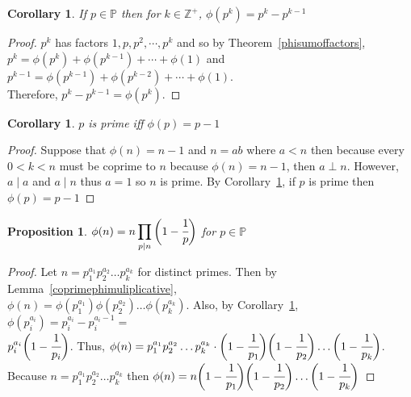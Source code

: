 \documentclass[12pt]{extarticle}
\renewcommand\qedsymbol{$\square$}
\newcommand{\divides}{\mid}
\newcommand{\Zplus}{\mathbb{Z}^{+}}
\newcommand{\Primes}{\mathbb{P}}
\newtheorem{proposition}[theorem]{Proposition}
\newtheorem{corollary}[theorem]{Corollary}
\newenvironment{lproof}{\begin{proof} \renewcommand{\qedsymbol}{}}{\end{proof}}
\begin{document}
\begin{corollary}
\label{phiofprime}
If $p \in \Primes$ then for $k \in \Zplus$, $\phi (p^k) = p^k - p^{k-1}$
\end{corollary}

\begin{lproof}
$p^k$ has factors $1,p,p^2, \cdots ,p^k$ and so by Theorem~\ref{phisumoffactors}, \\$p^k = \phi (p^k) + \phi (p^{k-1}) + \cdots + \phi (1)$ and $p^{k-1} = \phi (p^{k-1}) + \phi (p^{k-2}) + \cdots + \phi (1)$. \\ Therefore, $p^k - p^{k-1} = \phi (p^k)$.
\end{lproof}

\begin{corollary}
\label{primeiffphi}
$p$ is prime iff $\phi(p) = p - 1$
\end{corollary}

\begin{lproof}
Suppose that $\phi (n) = n - 1$ and $n = ab$ where $a < n$ then because every $0 < k < n$ must be coprime to $n$ because $\phi(n) = n - 1$, then $a \perp n$. However, $a \divides a$ and $a \divides n$ thus $a = 1$ so $n$ is prime. By Corollary~\ref{phiofprime}, if $p$ is prime then $\phi(p) = p - 1$
\end{lproof}

\begin{proposition}
\label{phiformula}
$\phi (n) = n \displaystyle\prod \limits_{p \divides n} \bigg(1-\cfrac{1}{p}\bigg)$ for $p \in \Primes$
\end{proposition}

\begin{lproof}
Let $n = p_1^{a_1}   p_2^{a_2}   \dots   p_k^{a_k}$ for distinct primes. Then by Lemma~\ref{coprimephimuliplicative}, \\ $\phi (n) = \phi (p_1^{a_1}) \phi (p_2^{a_2}) \dots \phi (p_k^{a_k})$. Also, by Corollary~\ref{phiofprime}, $\phi (p_i^{a_i}) = p_i^{a_i} - p_i^{a_i-1} =$ \\ $ p_i^{a_i}\bigg(1 - \cfrac{1}{p_i}\bigg)$. Thus, $\phi (n) =  p_1^{a_1}   p_2^{a_2}   \dots   p_k^{a_k} \cdot \bigg(1 - \cfrac{1}{p_1}\bigg)\bigg(1 - \cfrac{1}{p_2}\bigg) \dots \bigg(1 - \cfrac{1}{p_k}\bigg)$. \\
Because $n = p_1^{a_1}   p_2^{a_2}   \dots p_k^{a_k}$ then $\phi (n) = n \bigg(1 - \cfrac{1}{p_1}\bigg)\bigg(1 - \cfrac{1}{p_2}\bigg) \dots \bigg(1 - \cfrac{1}{p_k}\bigg)$
\end{lproof}
\end{document}
